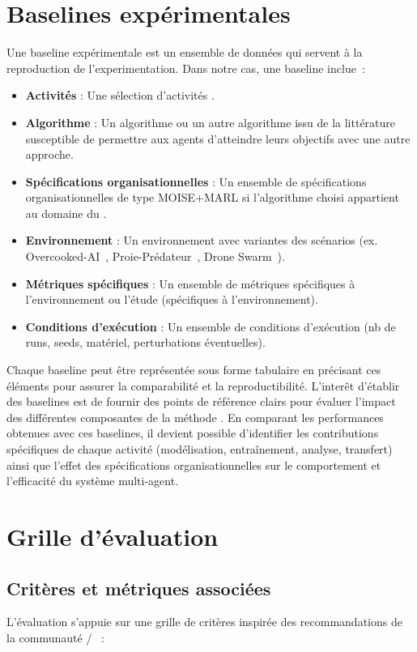 \section{Baselines expérimentales}

Une baseline expérimentale est un ensemble de données qui servent à la reproduction de l'experimentation. Dans notre cas, une baseline inclue~:
\begin{itemize}
  \item \textbf{Activités} : Une sélection d'activités .
  \item \textbf{Algorithme} : Un algorithme  ou un autre algorithme issu de la littérature susceptible de permettre aux agents d'atteindre leurs objectifs avec une autre approche.
  \item \textbf{Spécifications organisationnelles} : Un ensemble de spécifications organisationnelles de type MOISE+MARL si l'algorithme choisi appartient au domaine du .
  \item \textbf{Environnement} : Un environnement avec variantes des scénarios (ex. Overcooked-AI~\cite{overcookedai}, Proie-Prédateur~\cite{lowe2017multi}, Drone Swarm~\cite{cage_challenge_3_announcement}).
  \item \textbf{Métriques spécifiques} : Un ensemble de métriques spécifiques à l'environnement ou l'étude (spécifiques à l’environnement).
  \item \textbf{Conditions d’exécution} : Un ensemble de conditions d’exécution (nb de runs, seeds, matériel, perturbations éventuelles).
\end{itemize}

Chaque baseline peut être représentée sous forme tabulaire en précisant ces éléments pour assurer la comparabilité et la reproductibilité. L'interêt d'établir des baselines est de fournir des points de référence clairs pour évaluer l'impact des différentes composantes de la méthode . En comparant les performances obtenues avec ces baselines, il devient possible d'identifier les contributions spécifiques de chaque activité (modélisation, entraînement, analyse, transfert) ainsi que l'effet des spécifications organisationnelles sur le comportement et l'efficacité du système multi-agent.

\section{Grille d’évaluation}

\subsection{Critères et métriques associées}
L’évaluation s’appuie sur une grille de critères inspirée des recommandations de la communauté /~\cite{papoudakis2021agent} :

